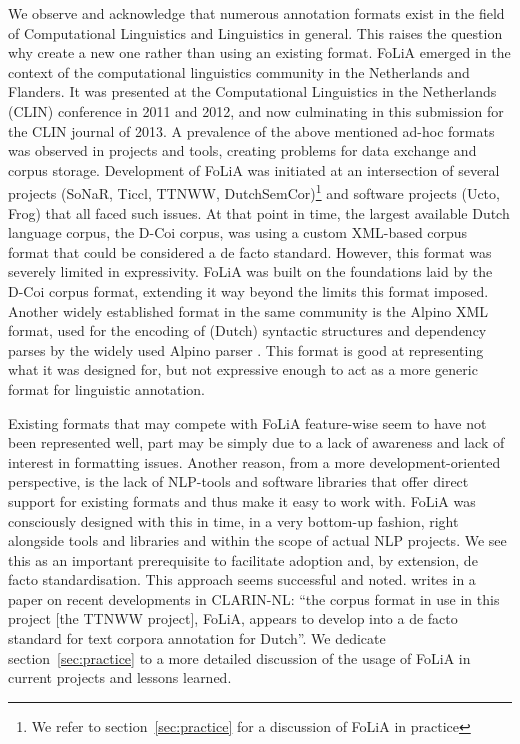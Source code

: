 \documentclass[a4paper,10pt,twoside]{article}
\begin{document}
We observe and acknowledge that numerous annotation formats exist in the field
of Computational Linguistics and Linguistics in general. This raises the
question why create a new one rather than using an existing format. FoLiA
emerged in the context of the computational linguistics community in the
Netherlands and Flanders. It was presented at the Computational Linguistics in
the Netherlands (CLIN) conference in 2011 and 2012, and now culminating in this
submission for the CLIN journal of 2013. A prevalence of the above mentioned
ad-hoc formats was observed in projects and tools, creating problems for data
exchange and corpus storage. Development of FoLiA was initiated at an
intersection of several projects (SoNaR, Ticcl, TTNWW, DutchSemCor)\footnote{We
refer to section~\ref{sec:practice} for a discussion of FoLiA in practice} and
software projects (Ucto, Frog) that all faced such issues. At that point in
time, the largest available Dutch language corpus, the D-Coi corpus, was using
a custom XML-based corpus format \cite{DCOI} that could be considered a
de facto standard. However, this format was severely limited in expressivity.
FoLiA was built on the foundations laid by the D-Coi corpus format, extending
it way beyond the limits this format imposed. Another widely established
format in the same community is the Alpino XML format, used for the encoding of
(Dutch) syntactic structures and dependency parses by the widely used Alpino
parser \cite{ALPINO}. This format is good at representing what it was
designed for, but not expressive enough to act as a more generic format for
linguistic annotation.

Existing formats that may compete with FoLiA feature-wise seem to have not been
represented well, part may be simply due to a lack of awareness and lack of interest in
formatting issues. Another reason, from a more development-oriented
perspective, is the lack of NLP-tools and software libraries that offer direct
support for existing formats and thus make it easy to work with. FoLiA was
consciously designed with this in time, in a very
bottom-up fashion, right alongside tools and libraries and within the scope of
actual NLP projects. We see this as an important prerequisite to facilitate
adoption and, by extension, de facto standardisation. This approach seems
successful and noted.  writes in a paper on recent developments
in CLARIN-NL: ``the corpus format in use in this project [the TTNWW project],
FoLiA, appears to develop into a de facto standard for text corpora annotation
for Dutch''. We dedicate section~\ref{sec:practice} to a more detailed
discussion of the usage of FoLiA in current projects and lessons learned.
\end{document}
